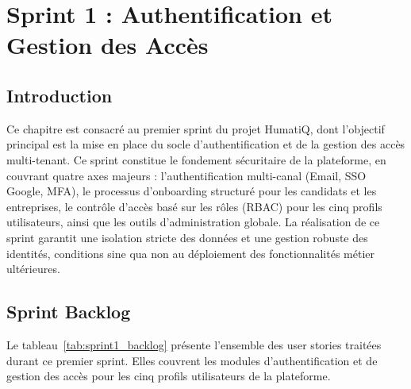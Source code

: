 %
\newpage
\pagestyle{fancy}
\renewcommand{\headrulewidth}{0.5pt}
\renewcommand{\footrulewidth}{0.5pt}
\chapter{Sprint 1 : Authentification et Gestion des Accès}
\setlength{\headheight}{27.06pt}
\label{ch4}
\minitoc
\newpage

\section*{Introduction}

Ce chapitre est consacré au premier sprint du projet HumatiQ, dont l'objectif principal est la mise en place du socle d'authentification et de la gestion des accès multi-tenant. Ce sprint constitue le fondement sécuritaire de la plateforme, en couvrant quatre axes majeurs : l'authentification multi-canal (Email, SSO Google, MFA), le processus d'onboarding structuré pour les candidats et les entreprises, le contrôle d'accès basé sur les rôles (RBAC) pour les cinq profils utilisateurs, ainsi que les outils d'administration globale. La réalisation de ce sprint garantit une isolation stricte des données et une gestion robuste des identités, conditions sine qua non au déploiement des fonctionnalités métier ultérieures.

\section{Sprint Backlog}

Le tableau~\ref{tab:sprint1_backlog} présente l'ensemble des user stories traitées durant ce premier sprint. Elles couvrent les modules d'authentification et de gestion des accès pour les cinq profils utilisateurs de la plateforme.


